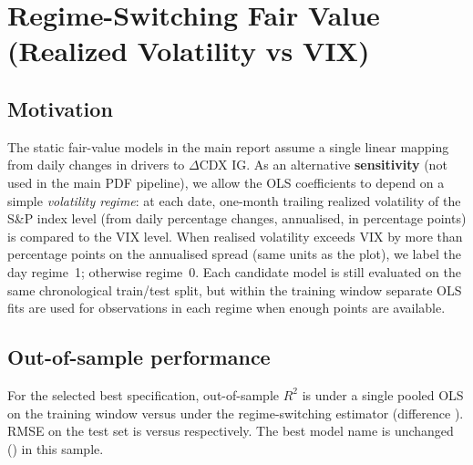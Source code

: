 \section{Regime-Switching Fair Value (Realized Volatility vs VIX)}


\subsection*{Motivation}

The static fair-value models in the main report assume a single linear mapping
from daily changes in drivers to \(\Delta\)CDX IG. As an alternative
\textbf{sensitivity} (not used in the main PDF pipeline), we allow the OLS
coefficients to depend on a simple \emph{volatility regime}: at each date,
one-month trailing realized volatility of the S\&P index level (from daily
percentage changes, annualised, in percentage points) is compared to the VIX
level. When realised volatility
exceeds VIX by more than \RegimeSignalThreshold{} percentage points on the
annualised spread (same units as the plot), we label the day
regime~1; otherwise regime~0. Each candidate model is still evaluated on the
same chronological train/test split, but within the training window separate OLS
fits are used for observations in each regime when enough points are available.

\subsection*{Out-of-sample performance}

For the selected best specification, out-of-sample \(R^2\) is
\BaselineStaticRsqOut{} under a single pooled OLS on the training window versus
\RegimeSwitchRsqOut{} under the regime-switching estimator (difference
\RegimeSwitchDeltaRsq{}). RMSE on the test set is
\BaselineStaticRmseOut{} versus \RegimeSwitchRmseOut{} respectively. The best
model name is unchanged (\RegimeSwitchBestModelReg{}) in this sample.

